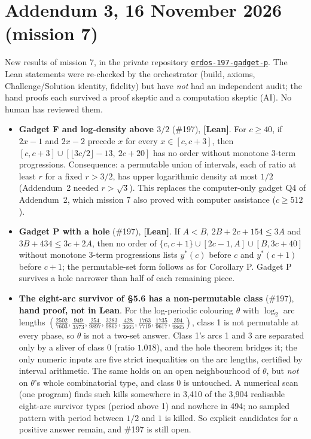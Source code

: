 \documentclass[11pt,letterpaper]{article}
\newcommand{\repo}[1]{\href{https://github.com/Alex-lop/#1}{\nolinkurl{#1}}}
\begin{document}
\section{Addendum 3, 16 November 2026 (mission 7)}
New results of mission 7, in the private repository \repo{erdos-197-gadget-p}. The Lean statements were re-checked by the
orchestrator (build, axioms, Challenge/Solution identity, fidelity) but have \emph{not} had an independent audit; the hand
proofs each survived a proof skeptic and a computation skeptic (AI). No human has reviewed them.
\begin{itemize}
\item \textbf{Gadget F and log-density above $3/2$} (\#197), \textbf{[Lean]}. For $c\ge 40$, if $2x-1$ and $2x-2$ precede $x$
for every $x\in[c,c+3]$, then $[c,c+3]\cup[\lfloor 3c/2\rfloor-13,\ 2c+20]$ has no order without monotone 3-term
progressions. Consequence: a permutable union of intervals, each of ratio at least $r$ for a fixed $r>3/2$, has upper
logarithmic density at most $1/2$ (Addendum~2 needed $r>\sqrt3$). This replaces the computer-only gadget Q4 of
Addendum~2, which mission 7 also proved with computer assistance ($c\ge 512$).
\item \textbf{Gadget P with a hole} (\#197), \textbf{[Lean]}. If $A<B$, $2B+2c+154\le 3A$ and $3B+434\le 3c+2A$, then no order
of $\{c,c+1\}\cup[2c-1,A]\cup[B,3c+40]$ without monotone 3-term progressions lists $y^*(c)$ before $c$ and $y^*(c+1)$
before $c+1$; the permutable-set form follows as for Corollary P. Gadget P survives a hole narrower than half of each
remaining piece.
\item \textbf{The eight-arc survivor of \S5.6 has a non-permutable class} (\#197), \textbf{hand proof, not in Lean}. For the
log-periodic colouring $\theta$ with $\log_2$ arc lengths $(\tfrac{2502}{7603},\tfrac{949}{3573},\tfrac{254}{9897},
\tfrac{3283}{9867},\tfrac{428}{3665},\tfrac{1763}{7719},\tfrac{1735}{9617},\tfrac{394}{9865})$, class 1 is not permutable at
every phase, so $\theta$ is not a two-set answer. Class 1's arcs 1 and 3 are separated only by a sliver of class 0 (ratio
$1.018$), and the hole theorem bridges it; the only numeric inputs are five strict inequalities on the arc lengths,
certified by interval arithmetic. The same holds on an open neighbourhood of $\theta$, but \emph{not} on $\theta$'s whole
combinatorial type, and class 0 is untouched. A numerical scan (one program) finds such kills somewhere in 3{,}410 of the
3{,}904 realisable eight-arc survivor types (period above 1) and nowhere in 494; no sampled pattern with period between $1/2$ and $1$
is killed. So explicit candidates for a positive answer remain, and \#197 is still open.
\end{itemize}
\end{document}
